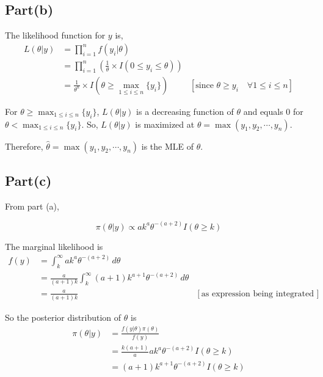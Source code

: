 \documentclass[a4paper]{article}
\begin{document}
\subsection*{Part(b)}
The likelihood function for $y$ is,
\begin{align*}
    L(\theta|y) &= \prod_{i=1}^{n} f(y_i|\theta)\\
    &= \prod_{i=1}^{n} \left(\frac{1}{\theta} \times I(0 \leq y_i \leq \theta)\right)\\
    &= \frac{1}{\theta^n} \times I(\theta \geq \max_{1\leq i \leq n} \{y_i\}) & [\text{since \(\theta \geq y_i \quad \forall 1\leq i \leq n\)}]
\end{align*}

For \(\theta \geq \max_{1\leq i \leq n} \{y_i\}\), \(L(\theta|y)\) is a decreasing function of \(\theta\) and equals 0 for \(\theta < \max_{1\leq i \leq n} \{y_i\}\).
So, \(L(\theta|y)\) is maximized at \(\theta = \max (y_1, y_2, \cdots, y_n)\).
\vspace{0.25cm}

\noindent Therefore, \(\hat{\theta} =  \max (y_1, y_2, \cdots, y_n)\) is the MLE of \(\theta\).

\subsection*{Part(c)}

From part (a),

\[
\pi(\theta|y)  \varpropto a k^{a} \theta^{-(a+2)} I(\theta \geq k)
\]

\vspace{0.25cm}
The marginal likelihood is 
\begin{align*}
    f(y) &= \int_{k}^{\infty} a k^{a} \theta^{-(a+2)} \,d\theta\\
        &= \frac{a}{(a+1)k}\int_{k}^{\infty} (a+1) k^{a+1} \theta^{-(a+2)} \,d\theta\\
        &= \frac{a}{(a+1)k} & \left[\text{as expression being integrated is pdf of Pareto distribution}\right]
\end{align*}

So the posterior distribution of \(\theta\) is 
\begin{align*}
    \pi(\theta|y) &= \frac{f(y|\theta)\pi(\theta)}{f(y)}\\ 
    &= \frac{k(a+1)}{a} a k^{a} \theta^{-(a+2)} I(\theta \geq k)\\
    &= (a+1) k^{a+1} \theta^{-(a+2)} I(\theta \geq k)\\
\end{align*}
\end{document}
